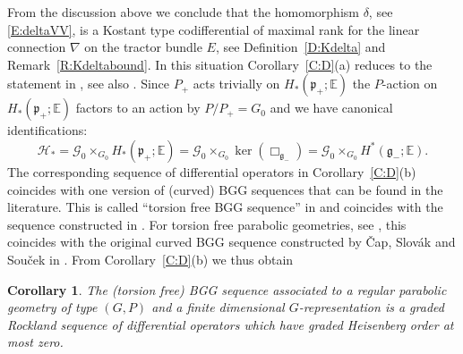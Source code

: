 \documentclass[reqno,12pt]{amsart}
\newcommand\goe{\mathfrak g}
\newcommand\poe{\mathfrak p}
\theoremstyle{plain}
\newtheorem{corollary}[theorem]{Corollary}
\theoremstyle{definition}
\begin{document}
From the discussion above we conclude that the homomorphism $\delta$, see \eqref{E:deltaVV}, is a Kostant type codifferential of maximal rank for the linear connection $\nabla$ on the tractor bundle $E$, see Definition~\ref{D:Kdelta} and Remark~\ref{R:Kdeltabound}.
In this situation Corollary~\ref{C:D}(a) reduces to the statement in \cite[Theorem~2.4]{CS12}, see also \cite{CSS01,CD01}.
Since $P_+$ acts trivially on $H_*(\poe_+;\mathbb E)$ the $P$-action on $H_*(\poe_+;\mathbb E)$ factors to an action by $P/P_+=G_0$ and we have canonical identifications:
$$
\mathcal H_*
=\mathcal G_0\times_{G_0}H_*(\poe_+;\mathbb E)
=\mathcal G_0\times_{G_0}\ker(\Box_{\goe_-})
=\mathcal G_0\times_{G_0}H^*(\goe_-;\mathbb E).
$$
The corresponding sequence of differential operators in Corollary~\ref{C:D}(b)
coincides with one version of (curved) BGG sequences that can be found in the literature.
This is called ``torsion free BGG sequence'' in \cite[Section~5]{CD01} and coincides with the sequence constructed in \cite[Section~2.4]{CS12}.
For torsion free parabolic geometries, see \cite[Section~1.5.7]{CS09}, this coincides with the original curved BGG sequence constructed by \v Cap, Slov\'ak and Sou\v cek in \cite{CSS01}.
From Corollary~\ref{C:D}(b) we thus obtain


\begin{corollary}\label{C:BGG}
The (torsion free) BGG sequence associated to a regular parabolic geometry of type $(G,P)$ and a finite dimensional $G$-representation is a graded Rockland sequence of differential operators which have graded Heisenberg order at most zero.
\end{corollary}
\end{document}
